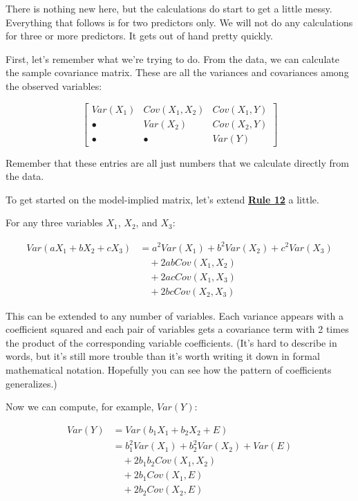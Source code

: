 \documentclass[
]{book}
\begin{document}
There is nothing new here, but the calculations do start to get a little messy. Everything that follows is for two predictors only. We will not do any calculations for three or more predictors. It gets out of hand pretty quickly.

First, let's remember what we're trying to do. From the data, we can calculate the sample covariance matrix. These are all the variances and covariances among the observed variables:

\[
\begin{bmatrix}
Var(X_{1})  &   Cov(X_{1}, X_{2})   &   Cov(X_{1}, Y) \\
\bullet     &   Var(X_{2})          &   Cov(X_{2}, Y) \\
\bullet     &   \bullet             &   Var(Y)
\end{bmatrix}
\]

Remember that these entries are all just numbers that we calculate directly from the data.

To get started on the model-implied matrix, let's extend \href{./covariance.html\#Rule12}{\textbf{Rule 12}} a little.

For any three variables \(X_{1}\), \(X_{2}\), and \(X_{3}\):

\begin{align}
Var(aX_{1} + bX_{2} + cX_{3}) &= 
    a^2Var(X_{1}) + b^2Var(X_{2}) + c^2Var(X_{3}) \\
    & \quad + 2abCov(X_{1}, X_{2}) \\
    & \quad + 2acCov(X_{1}, X_{3}) \\
    & \quad + 2bcCov(X_{2}, X_{3})
\end{align}

This can be extended to any number of variables. Each variance appears with a coefficient squared and each pair of variables gets a covariance term with 2 times the product of the corresponding variable coefficients. (It's hard to describe in words, but it's still more trouble than it's worth writing it down in formal mathematical notation. Hopefully you can see how the pattern of coefficients generalizes.)

Now we can compute, for example, \(Var(Y)\):

\begin{align}
Var(Y)  &= Var(b_{1}X_{1} + b_{2}X_{2} + E) \\
    &= b_{1}^{2} Var(X_{1}) + b_{2}^{2} Var(X_{2}) + Var(E) \\
    & \quad + 2b_{1}b_{2} Cov(X_{1}, X_{2}) \\
    & \quad + 2b_{1} Cov(X_{1}, E) \\
    & \quad + 2b_{2} Cov(X_{2}, E)
\end{align}
\end{document}
